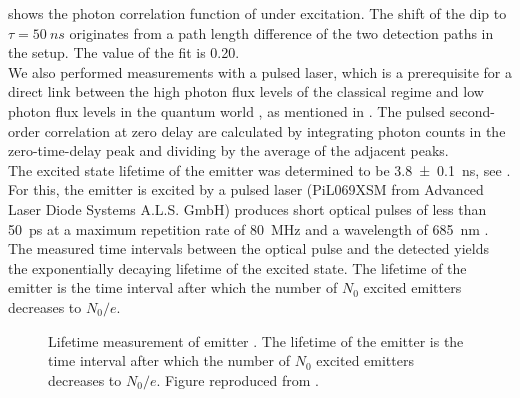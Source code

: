 		 shows the photon correlation function of \emhtwo under \cw excitation.
		The shift of the dip to $\tau=\SI{50}{ns}$ originates from a path length difference of the two detection paths in the \HBT setup.
		The \gtz value of the fit is \num{0.20}.
		\\
		We also performed measurements with a pulsed laser, which is a prerequisite for a direct link between the high photon flux levels of the classical regime and low photon flux levels in the quantum world \cite{Vaigu2017,SiquteProject}, as mentioned in .
		The pulsed second-order correlation at zero delay \gtz are calculated by integrating photon counts in the zero-time-delay peak and dividing by the average of the adjacent peaks.
		\\
		The excited state lifetime of the emitter was determined to be \SI[separate-uncertainty]{3.8\pm0.1}{ns}, see .
		For this, the emitter is excited by a pulsed laser (PiL069XSM from Advanced Laser Diode Systems A.L.S. GmbH) produces short optical pulses of less than \SI{50}{\ps} at a maximum repetition rate of \SI{80}{\mega\hertz} and a wavelength of \SI{685}{\nm} \cite{Vaigu2017}. 
		The measured time intervals between the optical pulse and the detected \fl yields the exponentially decaying lifetime of the excited state.
		The lifetime of the emitter is the time interval after which the number of $N_0$ excited emitters decreases to $N_0/e$.
		
		\begin{figure}[!htb]
			\centering
			\caption{Lifetime measurement of emitter \emhtwo. The lifetime of the emitter is the time interval after which the number of $N_0$ excited emitters decreases to $N_0/e$. Figure reproduced from \cite{Vaigu2017}.}
			\label{fig::lifetime}
		\end{figure}

